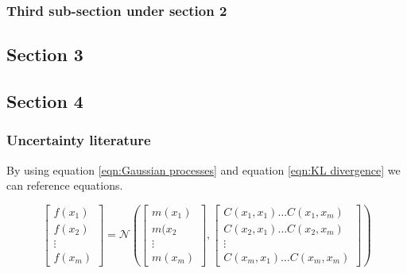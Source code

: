 \subsubsection{Third sub-section under section 2}\label{ssec:subsubsec_2.2.3}



\subsection{Section 3}\label{sec:subsec_2.3}



\subsection{Section 4}\label{sec:subsec_2.4}


\subsubsection{Uncertainty literature}\label{ssec:subsubsec_2.4.4}
By using equation \eqref{eqn:Gaussian processes} and equation \eqref{eqn:KL divergence} we can reference equations.

\def\A{
\begin{bmatrix}
   f(x_{1}) \\
   f(x_{2}) \\
   \vdots \\
   f(x_{m})
\end{bmatrix}
}

\def\B{
\begin{bmatrix}
    m(x_{1})\\
    m(x_{2}\\
    \vdots \\
    m(x_{m})
\end{bmatrix}
}

\def\C{
\begin{bmatrix}
    C(x_{1},x_{1}) \hdots C(x_{1},x_{m})\\
    C(x_{2},x_{1}) \hdots C(x_{2},x_{m})\\
    \vdots \\
    C(x_{m},x_{1}) \hdots C(x_{m},x_{m})
\end{bmatrix}
}
\begin{equation}\label{eqn:Gaussian processes}
    \A = \mathcal{N} \left(\B, \C\right)
\end{equation}

